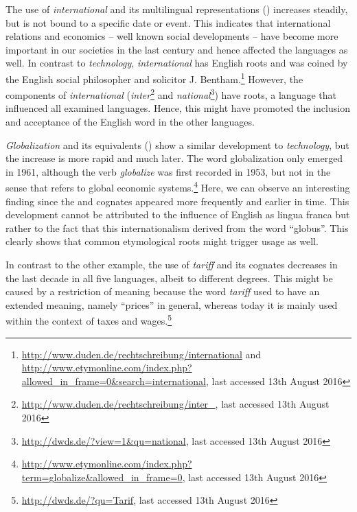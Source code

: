 \documentclass[output=paper]{LSP/langsci}
\begin{document}
The use of \textit{international} and its multilingual  representations () increases steadily, but is not bound to a specific date or event. This indicates that international relations and economics – well known social developments – have become more important in our societies in the last century and hence affected the languages as well. In contrast to \textit{technology}, \textit{international} has English roots and was coined by the English social philosopher and solicitor J. Bentham.\footnote{\url{http://www.duden.de/rechtschreibung/international} and \url{http://www.etymonline.com/index.php?allowed_in_frame=0&search=international}, last accessed 13th August 2016} However, the components of \textit{international} (\textit{inter}\footnote{\url{http://www.duden.de/rechtschreibung/inter_}, last accessed 13th August 2016} and \textit{national}\footnote{\url{http://dwds.de/?view=1\&qu=national}, last accessed 13th August 2016}) have  roots, a language that influenced all examined languages. Hence, this might have promoted the inclusion and acceptance of the English word in the other languages.

\newpage 
\textit{Globalization} and its equivalents () show a similar development to \textit{technology}, but the increase is more rapid and much later. The word globalization only emerged in 1961, although the verb \textit{globalize} was first recorded in 1953, but not in the sense that refers to global economic systems.\footnote{\url{http://www.etymonline.com/index.php?term=globalize&allowed_in_frame=0}, last accessed 13th August 2016} Here, we can observe an interesting finding since the  and  cognates appeared more frequently and earlier in time. This development cannot be attributed to the influence of English as lingua franca but rather to the fact that this internationalism derived from the  word “globus”. This clearly shows that common etymological roots might trigger  usage as well.

In contrast to the other example, the use of \textit{tariff} and its cognates decreases in the last decade in all five languages, albeit to different degrees. This might be caused by a restriction of meaning because the word \textit{tariff} used to have an extended meaning, namely “prices” in general, whereas today it is mainly used within the context of taxes and wages.\footnote{\url{http://dwds.de/?qu=Tarif}, last accessed 13th August 2016} 
\end{document}
